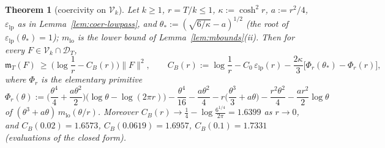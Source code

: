 \documentclass[10pt]{amsart}
\newtheorem{theorem}{Theorem}[section]
\theoremstyle{definition}
\theoremstyle{remark}
\newcommand{\mT}{\mathfrak m_T}
\begin{document}
\begin{theorem}[coercivity on $\mathcal V_k$]\label{thm:coer-B}
Let $k\ge1$, $r=T/k\le1$, $\kappa:=\cosh^2r$, $a:=r^2/4$, $\varepsilon_{\mathrm{lp}}$ as in
Lemma~\ref{lem:coer-lowpass}, and $\theta_*:=(\sqrt{6/\kappa}-a)^{1/2}$ (the root of $\varepsilon_{\mathrm{lp}}(\theta_*)=1$); $m_{\mathrm{lo}}$ is
the lower bound of Lemma~\ref{lem:mbounds}(ii).
Then for every $F\in\mathcal V_k\cap\mathcal D_T$,
\begin{equation}\label{eq:coer-B}
\mT(F)\ \ge\ \Big(\log\frac1r-C_B(r)\Big)\|F\|^2,\qquad
C_B(r):=\log\frac1r-C_0\,\varepsilon_{\mathrm{lp}}(r)-\frac{2\kappa}3\big[\Phi_r(\theta_*)-\Phi_r(r)\big],
\end{equation}
where $\Phi_r$ is the elementary primitive
\[
\Phi_r(\theta):=\Big(\frac{\theta^4}4+\frac{a\theta^2}2\Big)\big(\log\theta-\log(2\pi r)\big)-\frac{\theta^4}{16}-\frac{a\theta^2}4
-r\Big(\frac{\theta^3}3+a\theta\Big)-\frac{r^2\theta^2}4-\frac{ar^2}2\log\theta
\]
of $(\theta^3+a\theta)\,m_{\mathrm{lo}}(\theta/r)$. Moreover $C_B(r)\to\frac14-\log\frac{6^{1/4}}{2\pi}=1.6399$ as
$r\to0$, and $C_B(0.02)=1.6573$, $C_B(0.0619)=1.6957$, $C_B(0.1)=1.7331$ (evaluations of the closed form).
\end{theorem}
\end{document}

